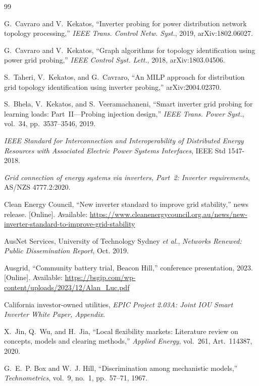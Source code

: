 \documentclass[journal,onecolumn,11pt]{IEEEtran}
\begin{document}
\begin{thebibliography}{99}

G.~Cavraro and V.~Kekatos, ``Inverter probing for power distribution network topology processing,'' \emph{IEEE Trans. Control Netw. Syst.}, 2019, arXiv:1802.06027.

G.~Cavraro and V.~Kekatos, ``Graph algorithms for topology identification using power grid probing,'' \emph{IEEE Control Syst. Lett.}, 2018, arXiv:1803.04506.

S.~Taheri, V.~Kekatos, and G.~Cavraro, ``An MILP approach for distribution grid topology identification using inverter probing,'' arXiv:2004.02370.

S.~Bhela, V.~Kekatos, and S.~Veeramachaneni, ``Smart inverter grid probing for learning loads: Part~II---Probing injection design,'' \emph{IEEE Trans. Power Syst.}, vol.~34, pp.~3537--3546, 2019.

\emph{IEEE Standard for Interconnection and Interoperability of Distributed Energy Resources with Associated Electric Power Systems Interfaces}, IEEE Std 1547-2018.

\emph{Grid connection of energy systems via inverters, Part~2: Inverter requirements}, AS/NZS 4777.2:2020.

Clean Energy Council, ``New inverter standard to improve grid stability,'' news release. [Online]. Available: \url{https://www.cleanenergycouncil.org.au/news/new-inverter-standard-to-improve-grid-stability}

AusNet Services, University of Technology Sydney \emph{et al.}, \emph{Networks Renewed: Public Dissemination Report}, Oct. 2019.

Ausgrid, ``Community battery trial, Beacon Hill,'' conference presentation, 2023. [Online]. Available: \url{https://bsgip.com/wp-content/uploads/2023/12/Alan_Luc.pdf}

California investor-owned utilities, \emph{EPIC Project 2.03A: Joint IOU Smart Inverter White Paper, Appendix}.

X.~Jin, Q.~Wu, and H.~Jia, ``Local flexibility markets: Literature review on concepts, models and clearing methods,'' \emph{Applied Energy}, vol.~261, Art.~114387, 2020.

G.~E.~P. Box and W.~J. Hill, ``Discrimination among mechanistic models,'' \emph{Technometrics}, vol.~9, no.~1, pp.~57--71, 1967.


\end{thebibliography}
\end{document}
